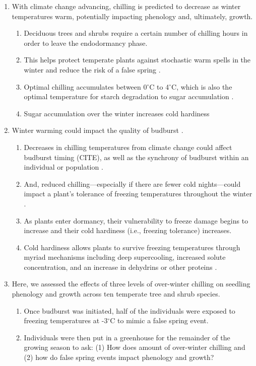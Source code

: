 \documentclass{article}\usepackage[]{graphicx}\usepackage[]{color}
\begin{document}
\begin{enumerate}
\item With climate change advancing, chilling is predicted to decrease as winter temperatures warm, potentially impacting phenology and, ultimately, growth.
  \begin{enumerate}
  \item Deciduous trees and shrubs require a certain number of chilling hours in order to leave the endodormancy phase. 
  \item This helps protect temperate plants against stochastic warm spells in the winter and reduce the risk of a false spring \citep{Basler2014}.
  \item Optimal chilling accumulates between 0$^{\circ}$C to 4$^{\circ}$C, which is also the optimal temperature for starch degradation to sugar accumulation \citep{Tixier2019}.
  \item Sugar accumulation over the winter increases cold hardiness 
  \end{enumerate}

\item Winter warming could impact the quality of budburst \citep{Bonhomme2010}.
  \begin{enumerate}
  \item Decreases in chilling temperatures from climate change could affect budburst timing (CITE), as well as the synchrony of budburst within an individual or population \citep{Sanzperez2009}.
  \item And, reduced chilling---especially if there are fewer cold nights---could impact a plant's tolerance of freezing temperatures throughout the winter \citep{Charrier2011}.
  \item As plants enter dormancy, their vulnerability to freeze damage begins to increase and their cold hardiness (i.e., freezing tolerance) increases. 
  \item Cold hardiness allows plants to survive freezing temperatures through myriad mechanisms including deep supercooling, increased solute concentration, and an increase in dehydrins or other proteins \citep{Sakai1987, Strimbeck2015}.
  \end{enumerate}
  

\item Here, we assessed the effects of three levels of over-winter chilling on seedling phenology and growth across ten temperate tree and shrub species. 
  \begin{enumerate}
  \item Once budburst was initiated, half of the individuals were exposed to freezing temperatures at -3$^{
  \circ}$C to mimic a false spring event. 
  \item Individuals were then put in a greenhouse for the remainder of the growing season to ask: (1) How does amount of over-winter chilling and (2) how do false spring events impact phenology and growth?
  \end{enumerate}
\end{enumerate}
  
\end{document}

